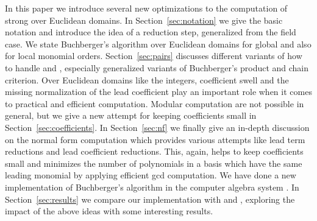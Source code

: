 In this paper we introduce several new optimizations to the computation of
strong \stbs over Euclidean domains. In Section~\ref{sec:notation} we give the
basic notation and introduce the idea of a reduction step, generalized from the
field case. We state
Buchberger's algorithm over Euclidean domains for global and also for local
monomial orders. Section~\ref{sec:pairs} discusses different variants of how to
handle \spts and \gpts, especially generalized variants of Buchberger's product
and chain criterion. Over Euclidean domains like the integers, coefficient swell
and the missing normalization of the lead coefficient play an important role when it
comes to practical and efficient computation. Modular computation are not
possible in general, but we give a new attempt for keeping coefficients small
in Section~\ref{sec:coefficients}. In Section~\ref{sec:nf} we finally give an
in-depth discussion on the normal form computation which provides various attempts
like lead term reductions and lead coefficient reductions. This, again, helps to keep coefficients small and
minimizes the number of polynomials in a basis which have the same
leading monomial by applying efficient gcd computation.
We have done a new implementation of Buchberger's algorithm in the computer
algebra system \singular. In Section~\ref{sec:results} we compare our implementation
with \macaulay and \magma, exploring the impact of the above ideas with
some interesting results.
